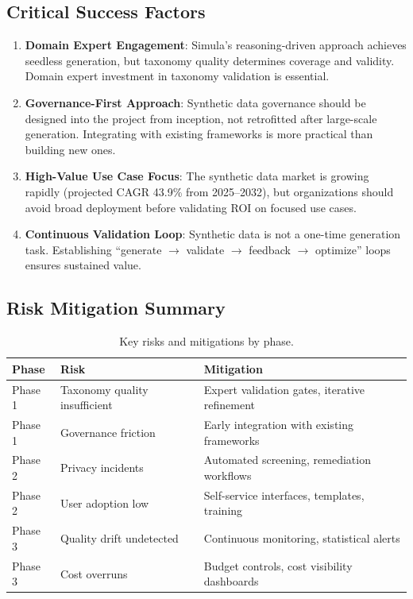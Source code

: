 \documentclass[12pt,a4paper,twoside]{report}
\begin{document}
\subsection{Critical Success Factors}

\begin{enumerate}
\item \textbf{Domain Expert Engagement}: Simula's reasoning-driven approach
achieves seedless generation, but taxonomy quality determines coverage and
validity. Domain expert investment in taxonomy validation is essential.

\item \textbf{Governance-First Approach}: Synthetic data governance should be
designed into the project from inception, not retrofitted after large-scale
generation. Integrating with existing frameworks is more practical than
building new ones.

\item \textbf{High-Value Use Case Focus}: The synthetic data market is growing
rapidly (projected CAGR 43.9\% from 2025--2032), but organizations should avoid
broad deployment before validating ROI on focused use cases.

\item \textbf{Continuous Validation Loop}: Synthetic data is not a one-time
generation task. Establishing ``generate $\to$ validate $\to$ feedback $\to$
optimize'' loops ensures sustained value.
\end{enumerate}

\subsection{Risk Mitigation Summary}

\begin{table}[htbp]
\centering
\caption{Key risks and mitigations by phase.}
\label{tab:phase-risks}
\footnotesize
\begin{tabularx}{\textwidth}{@{}l l X@{}}
\toprule
\textbf{Phase} & \textbf{Risk} & \textbf{Mitigation} \\
\midrule
Phase 1 & Taxonomy quality insufficient & Expert validation gates, iterative refinement \\
Phase 1 & Governance friction & Early integration with existing frameworks \\
Phase 2 & Privacy incidents & Automated screening, remediation workflows \\
Phase 2 & User adoption low & Self-service interfaces, templates, training \\
Phase 3 & Quality drift undetected & Continuous monitoring, statistical alerts \\
Phase 3 & Cost overruns & Budget controls, cost visibility dashboards \\
\bottomrule
\end{tabularx}
\end{table}
\end{document}
